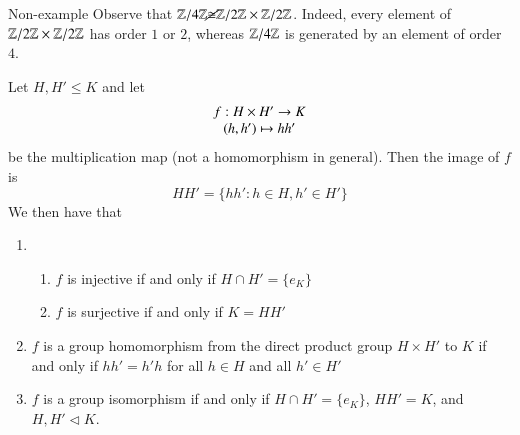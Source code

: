 \documentclass[12pt, a4paper, twoside, openright, titlepage]{book}
\begin{document}
\begin{eg}{Non-example}{}
        Observe that $\mathbb Z/4\mathbb Z \cancel{\cong} \mathbb Z/2\mathbb Z \times \mathbb Z/2\mathbb Z$. Indeed, every element of $\mathbb Z/2\mathbb Z \times \mathbb Z/2\mathbb Z$ has order $1$ or $2$, whereas $\mathbb Z/4\mathbb Z$ is generated by an element of order $4$.
\end{eg}


\begin{prop}{}{}
        Let $H,H' \leq K$ and let \begin{equation}
                \begin{array}{c} f:H\times H' \rightarrow K \\ (h,h') \mapsto hh' \end{array}
        \end{equation}
        be the multiplication map (not a homomorphism in general). Then the image of $f$ is \begin{equation}
                HH' = \{hh':h\in H, h' \in H'\}
        \end{equation}
        We then have that \begin{enumerate}
                \item \begin{enumerate}
                                \item $f$ is injective if and only if $H \cap H' = \{e_K\}$
                                \item $f$ is surjective if and only if $K = HH'$
                        \end{enumerate}
                \item $f$ is a group homomorphism from the direct product group $H \times H'$ to $K$ if and only if $hh' = h'h$ for all $h \in H$ and all $h' \in H'$
                \item $f$ is a group isomorphism if and only if $H \cap H' = \{e_K\}$, $HH' = K$, and $H,H' \vartriangleleft K$.
        \end{enumerate}
\end{prop}
\end{document}
